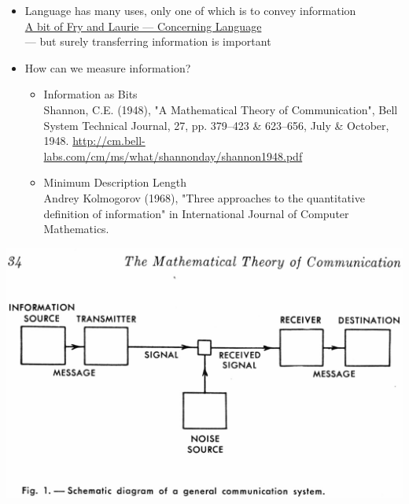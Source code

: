 \documentclass[a4paper,landscape,headrule,footrule,xetex]{foils}
\begin{document}




\begin{itemize}
\item Language has many uses, only one of which is to convey information
  \\ \href{https://www.youtube.com/watch?v=3MWpHQQ-wQg}{A bit of Fry and Laurie --- Concerning Language}
  \\ --- but surely transferring information is important
\item How can we measure information?
  \begin{itemize}
  \item Information as Bits
\\ {\small Shannon, C.E. (1948), "A Mathematical Theory of Communication", Bell System Technical Journal, 27, pp. 379–423 \& 623–656, July \& October, 1948. \url{http://cm.bell-labs.com/cm/ms/what/shannonday/shannon1948.pdf}}
  \item Minimum Description Length
\\ {\small Andrey Kolmogorov (1968), "Three approaches to the quantitative definition of information" in International Journal of Computer Mathematics.}
  \end{itemize}
\end{itemize}

\begin{center}
  \includegraphics[height=0.9\textheight]{../pics/shannon_comm_channel}
\end{center}
\end{document}
